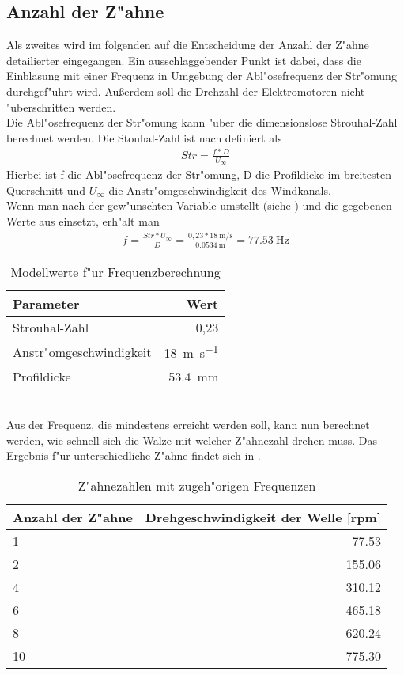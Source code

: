 \subsection{Anzahl der Z"ahne}
Als zweites wird im folgenden auf die Entscheidung der Anzahl der Z"ahne detailierter eingegangen. Ein ausschlaggebender Punkt ist dabei, dass die Einblasung mit einer Frequenz in Umgebung der Abl"osefrequenz der Str"omung durchgef"uhrt wird. Au\ss{}erdem soll die Drehzahl der Elektromotoren nicht "uberschritten werden.\\
Die Abl"osefrequenz der Str"omung kann "uber die dimensionslose Strouhal-Zahl berechnet werden. Die Stouhal-Zahl ist nach \cite{Leder.1992} definiert als
\begin{align}
	{Str}=\frac{f*D}{U_{\infty}}	\label{eq:Str}
\end{align}
Hierbei ist f die Abl"osefrequenz der Str"omung, D die Profildicke im breitesten Querschnitt und $U_{\infty}$ die Anstr"omgeschwindigkeit des Windkanals.\\
Wenn man  nach der gew"unschten Variable umstellt (siehe ) und die gegebenen Werte aus  einsetzt, erh"alt man
\begin{align}
	{f}=\frac{Str*U_{\infty}}{D}
		=\frac{0,23*\SI{18}{\meter\per\second}}{\SI{0,0534}{\meter}}
		=\SI{77,53}{\hertz}
		\label{eq:nachfumgestellt}
\end{align}
\begin{table}[h!]
	\centering
	\begin{tabular}{lr}
		\toprule
		Parameter & Wert\\
		\midrule
		Strouhal-Zahl & 0,23\\
		Anstr"omgeschwindigkeit & \SI{18}{\meter\per\second}\\
		Profildicke & \SI{53,4}{\milli\meter}\\
		\bottomrule
	\end{tabular}
	\caption{Modellwerte f"ur Frequenzberechnung}
	\label{tab:Modellwerte}
\end{table}\\
Aus der Frequenz, die mindestens erreicht werden soll, kann nun berechnet werden, wie schnell sich die Walze mit welcher Z"ahnezahl drehen muss. Das Ergebnis f"ur unterschiedliche Z"ahne findet sich in .\\
\begin{table}[h]
	\centering
	\begin{tabular}{lr}
		\toprule
		Anzahl der Z"ahne & Drehgeschwindigkeit der Welle [rpm]\\
		\midrule
		1 & 77.53\\
		2 & 155.06\\
		4 & 310.12\\
		6 & 465.18\\
		8 & 620.24\\
		10 & 775.30\\
		\bottomrule
	\end{tabular}\\
	\caption{Z"ahnezahlen mit zugeh"origen Frequenzen}
	\label{tab:zahnezahl}
\end{table}
